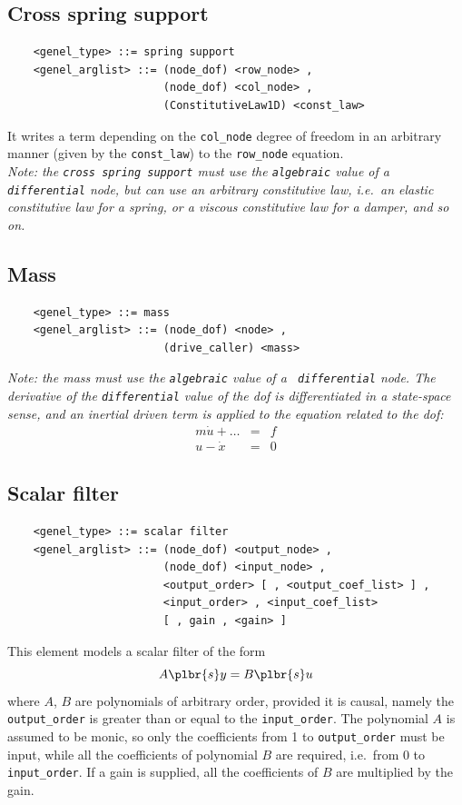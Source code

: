 \documentclass[10pt,dvips]{report}
\begin{document}
\subsection{Cross spring support}
\begin{verbatim}
    <genel_type> ::= spring support
    <genel_arglist> ::= (node_dof) <row_node> ,                      
                        (node_dof) <col_node> ,                      
                        (ConstitutiveLaw1D) <const_law>
\end{verbatim}
It writes a term depending on the {\tt col\_node} degree of freedom in an
arbitrary manner (given by the {\tt const\_law}) to the 
{\tt row\_node} equation. \\
{\em
    Note: the {\tt cross spring support} must use the {\tt algebraic} value
    of a {\tt differential} node, but can use an arbitrary constitutive law,
    i.e.\ an elastic constitutive law for a spring, or a viscous
    constitutive law for a damper, and so on.
}

\subsection{Mass}
\begin{verbatim}
    <genel_type> ::= mass
    <genel_arglist> ::= (node_dof) <node> ,                     
                        (drive_caller) <mass>
\end{verbatim}
{\em
    Note: the mass must use the {\tt algebraic} value of a {\tt
    differential} node. The derivative of the {\tt differential} value of
    the dof is differentiated in a state-space sense, and an inertial driven
    term is applied to the equation related to the dof:
    \begin{eqnarray*}
        m\dot{u} + \ldots & = & f \\
	u - \dot{x} & = & 0
    \end{eqnarray*}
}

\subsection{Scalar filter}
\begin{verbatim}
    <genel_type> ::= scalar filter
    <genel_arglist> ::= (node_dof) <output_node> ,
                        (node_dof) <input_node> ,
                        <output_order> [ , <output_coef_list> ] ,
                        <input_order> , <input_coef_list>
                        [ , gain , <gain> ]
\end{verbatim}
This element models a scalar filter of the form
\begin{displaymath}
    A\plbr{s}y = B\plbr{s}u
\end{displaymath}
where $ A $, $ B $ are polynomials of arbitrary order, provided it is
causal, namely the {\tt output\_order} is greater than or equal to 
the {\tt input\_order}.
The polynomial $ A $ is assumed to be monic, so only the coefficients
from 1 to {\tt output\_order} must be input, while all the coefficients 
of polynomial $ B $ are required, i.e.\ from 0 to {\tt input\_order}.
If a gain is supplied, all the coefficients of $ B $ are multiplied by the
gain.
\end{document}
